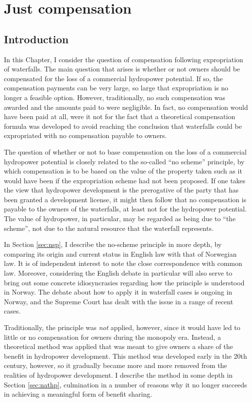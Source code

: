\chapter{Just compensation}\label{chap:5}

\section{Introduction}\label{sec:into5}

In this Chapter, I consider the question of compensation following expropriation of waterfalls. The main question that arises is whether or not owners should be compensated for the loss of a commercial hydropower potential. If so, the compensation payments can be very large, so large that expropriation is no longer a feasible option. However, traditionally, no such compensation was awarded and the amounts paid to were negligible. In fact, no compensation would have been paid at all, were it not for the fact that a theoretical compensation formula was developed to avoid reaching the conclusion that waterfalls could be expropriated with no compensation payable to owners.

The question of whether or not to base compensation on the loss of a commercial hydropower potential is closely related to the so-called ``no scheme'' principle, by which compensation is to be based on the value of the property taken such as it would have been if the expropriation scheme had not been proposed. If one takes the view that hydropower development is the prerogative of the party that has been granted a development license, it might then follow that no compensation is payable to the owners of the waterfalls, at least not for the hydropower potential. The value of hydropower, in particular, may be regarded as being due to ``the scheme'', not due to the natural resource that the waterfall represents. 

In Section \ref{sec:nsp}, I describe the no-scheme principle in more depth, by comparing its origin and current status in English law with that of Norwegian law. It is of independent interest to note the close correspondence with common law. Moreover, considering the English debate in particular will also serve to bring out some concrete idiosyncrasies regarding how the principle is understood in Norway. The debate about how to apply it in waterfall cases is ongoing in Norway, and the Supreme Court has dealt with the issue in a range of recent cases. 

Traditionally, the principle was {\it not} applied, however, since it would have led to little or no compensation for owners during the monopoly era. Instead, a theoretical method was applied that was meant to give owners a share of the benefit in hydropower development. This method was developed early in the 20th century, however, so it gradually became more and more removed from the realities of hydropower development. I describe the method in some depth in Section \ref{sec:nathp}, culmination in a number of reasons why it no longer succeeds in achieving a meaningful form of benefit sharing.

